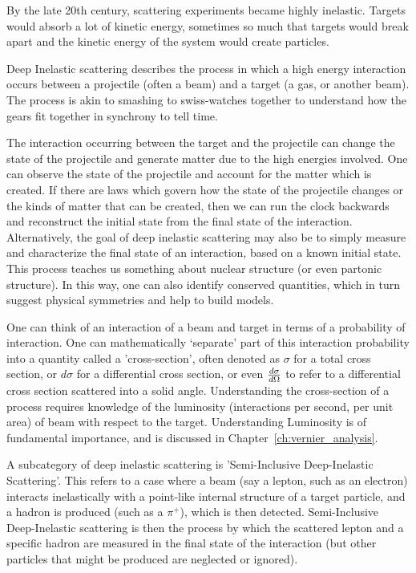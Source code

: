 By the late 20th century, scattering experiments became highly inelastic.
Targets would absorb a lot of kinetic energy, sometimes so much that targets
would break apart and the kinetic energy of the system would create particles.

Deep Inelastic scattering describes the process in which a high energy
interaction occurs between a projectile (often a beam) and a target (a gas, or
another beam). The process is akin to smashing to swiss-watches together to
understand how the gears fit together in synchrony to tell time. 

The interaction occurring between the target and the projectile can change the
state of the projectile and generate matter due to the high energies involved.
One can observe the state of the projectile and account for the matter which is
created.  If there are laws which govern how the state of the projectile changes
or the kinds of matter that can be created, then we can run the clock backwards
and reconstruct the initial state from the final state of the interaction.
Alternatively, the goal of deep inelastic scattering may also be to simply
measure and characterize the final state of an interaction, based on a known
initial state. This process teaches us something about nuclear structure (or
even partonic structure). In this way, one can also identify conserved
quantities, which in turn suggest physical symmetries and help to build models.

One can think of an interaction of a beam and target in terms of a probability
of interaction. One can mathematically `separate' part of this interaction
probability into a quantity called a 'cross-section', often denoted as $\sigma$
for a total cross section, or $d\sigma$ for a differential cross section, or
even ${d\sigma}\over{d\Omega}$ to refer to a differential cross section
scattered into a solid angle. Understanding the cross-section of a process
requires knowledge of the luminosity (interactions per second, per unit area) of
beam with respect to the target. Understanding Luminosity is of fundamental
importance, and is discussed in Chapter~\ref{ch:vernier_analysis}.

A subcategory of deep inelastic scattering is 'Semi-Inclusive Deep-Inelastic
Scattering'. This refers to a case where a beam (say a lepton, such as an
electron) interacts inelastically with a point-like internal structure of a
target particle, and a hadron is produced (such as a $\pi^+$), which is then
detected. Semi-Inclusive Deep-Inelastic scattering is then the process by which
the scattered lepton and a specific hadron are measured in the final state of
the interaction (but other particles that might be produced are neglected or
ignored).


